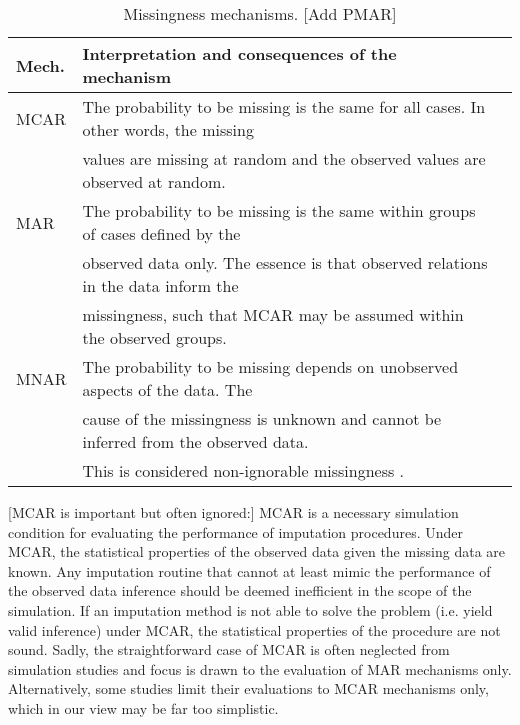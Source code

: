 \documentclass[bimj,fleqn]{w-art}
\begin{document}
\begin{table}[htb]
\begin{center}
\caption{Missingness mechanisms. [Add PMAR]}
\begin{tabular}{lll}
\hline
Mech. & Interpretation and consequences of the mechanism \\
\hline  
MCAR  & The probability to be missing is the same for all cases. In other words, the missing \\
      & values are missing at random and the observed values are observed at random. \\
MAR   & The probability to be missing is the same within groups of cases defined by the \\
      & observed data only. The essence is that observed relations in the data inform the \\
      & missingness, such that MCAR may be assumed within the observed groups. \\
MNAR  & The probability to be missing depends on unobserved aspects of the data. The \\
      & cause of the missingness is unknown and cannot be inferred from the observed data. \\
      & This is considered non-ignorable missingness \citep[see e.g.][]{rubi76}. \\
\hline
\end{tabular}
\end{center}
\end{table}

[MCAR is important but often ignored:] MCAR is a necessary simulation condition for evaluating the performance of imputation procedures. Under MCAR, the statistical properties of the observed data given the missing data are known. Any imputation routine that cannot at least mimic the performance of the observed data inference should be deemed inefficient in the scope of the simulation. If an imputation method is not able to solve the problem (i.e. yield valid inference) under MCAR, the statistical properties of the procedure are not sound. Sadly, the straightforward case of MCAR is often neglected from simulation studies and focus is drawn to the evaluation of MAR mechanisms only. Alternatively, some studies limit their evaluations to MCAR mechanisms only, which in our view may be far too simplistic. 
\end{document}
